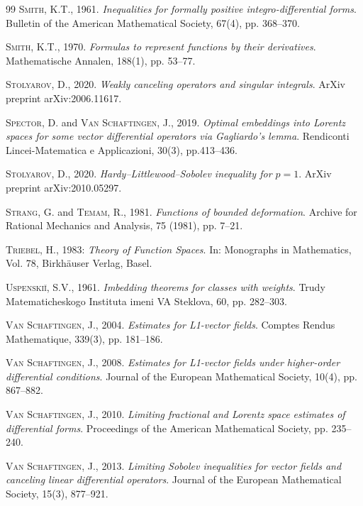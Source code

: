 \documentclass[a4paper,10pt]{amsart}
\numberwithin{equation}{section}
\theoremstyle{remark}
\numberwithin{equation}{section}
\begin{document}
\begin{thebibliography}{99}
		 \textsc{Smith, K.T.}, 1961. \emph{Inequalities for formally positive integro-differential forms}. Bulletin of the American Mathematical Society, 67(4), pp. 368--370.
		
		 \textsc{Smith, K.T.}, 1970. \emph{Formulas to represent functions by their derivatives}. Mathematische Annalen, {188}(1), pp.  53--77.
		
		 \textsc{Stolyarov, D.}, 2020. \emph{Weakly canceling operators and singular integrals}. ArXiv preprint arXiv:2006.11617.
		
		 \textsc{Spector, D.} and \textsc{Van Schaftingen, J.}, 2019. \emph{Optimal embeddings into Lorentz spaces for some vector differential operators via Gagliardo’s lemma}. Rendiconti Lincei-Matematica e Applicazioni, 30(3), pp.413--436.
		
		 \textsc{Stolyarov, D.}, 2020. \emph{Hardy--Littlewood--Sobolev inequality for $ p= 1$}. ArXiv preprint arXiv:2010.05297.
		
		 \textsc{Strang, G.} and \textsc{Temam, R.}, 1981. \emph{Functions of bounded deformation}. Archive for Rational Mechanics and Analysis, 75 (1981), pp. 7--21.
		
		
		  \textsc{Triebel, H.}, 1983: \emph{Theory of Function Spaces}. In: Monographs in Mathematics, Vol. 78, Birkh\"{a}user Verlag, Basel.
		
		 \textsc{Uspenski\u{\i}, S.V.}, 1961. \emph{Imbedding theorems for classes with weights}. Trudy Matematicheskogo Instituta imeni VA Steklova, 60, pp. 282--303.
		
		 \textsc{Van Schaftingen, J.}, 2004. \emph{Estimates for L1-vector fields}. Comptes Rendus Mathematique, 339(3), pp. 181--186.
		
		 \textsc{Van Schaftingen, J.}, 2008. \emph{Estimates for L1-vector fields under higher-order differential conditions}. Journal of the European Mathematical Society, 10(4), pp. 867--882.
		
		 \textsc{Van Schaftingen, J.}, 2010. \emph{Limiting fractional and Lorentz space estimates of differential forms}. Proceedings of the American Mathematical Society, pp. 235--240.
		
		 \textsc{Van Schaftingen, J.}, 2013. \emph{Limiting Sobolev inequalities for vector fields and canceling linear differential operators}. Journal of the European Mathematical Society, {15}(3),  877--921. 
		
	\end{thebibliography}
\end{document}
